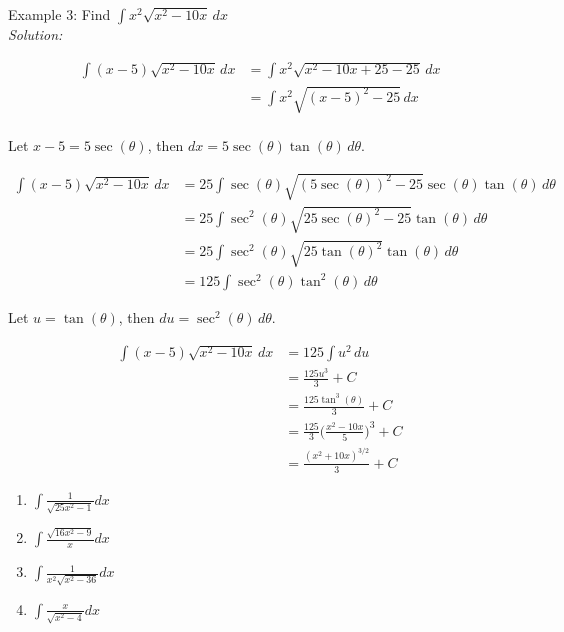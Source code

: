 \documentclass[16pt]{article}
\theoremstyle{remark}
\begin{document}
\begin{mdframed}[style=TheoremFrame]
Example 3: Find $\displaystyle{ \int x^2 \sqrt{x^2 - 10x} \, dx }$\\

\textit{Solution:}

\begin{align*}
\int (x-5) \sqrt{x^2 - 10x} \, dx &= \int x^2 \sqrt{x^2 - 10x+ 25 - 25} \, dx \\[1.5ex]
&= \int x^2 \sqrt{(x-5)^2 - 25} \, dx\\
\end{align*}
\begin{center}
Let $x -5 = 5\sec(\theta)$, then $dx = 5 \sec(\theta) \tan(\theta) \, d\theta$.
\end{center}
\begin{align*}
\int (x-5) \sqrt{x^2 - 10x} \, dx &= 25 \int \sec(\theta) \sqrt{(5\sec(\theta))^2 - 25} \sec(\theta) \tan(\theta) \, d\theta\\[1.5ex]
&= 25 \int \sec^2(\theta) \sqrt{25\sec(\theta)^2 - 25}\tan(\theta) \, d\theta\\[1.5ex]
&= 25 \int \sec^2(\theta) \sqrt{25\tan(\theta)^2}\tan(\theta) \, d\theta\\[1.5ex]
&= 125 \int \sec^2(\theta)\tan^2(\theta) \, d\theta
\end{align*}
\begin{center}
Let $u = \tan(\theta)$, then $du = \sec^2(\theta) \, d\theta$.
\end{center}
\begin{align*}
\int (x-5) \sqrt{x^2 - 10x} \, dx &= 125 \int u^2 \, du\\[1.5ex]
&= \frac{125u^3}{3}+C\\[1.5ex]
&= \frac{125\tan^3(\theta)}{3}+C\\[1.5ex]
&= \frac{125}{3} \bigg(\frac{x^2-10x}{5} \bigg)^3 + C\\[1.5ex]
&= \frac{(x^2+10x)^{3/2}}{3} + C
\end{align*}
\end{mdframed}

\begin{enumerate}
\item $\displaystyle{\int \frac{1}{\sqrt{25x^2-1}} dx}$
\vspace{9cm}
\item $\displaystyle{\int \frac{\sqrt{16x^2-9}}{x} dx}$
\vspace{4cm}
\newpage
\item $\displaystyle{\int \frac{1}{x^2\sqrt{x^2-36}} dx}$
\vspace{9cm}

\item $\displaystyle{\int \frac{x}{\sqrt{x^2-4}} dx}$
\vspace{4cm}


\end{enumerate}
\end{document}
